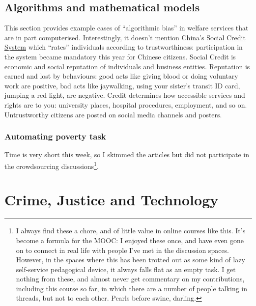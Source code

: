 \documentclass[
]{book}
\begin{document}
\hypertarget{china-scs}{%
\subsection{Algorithms and mathematical models}\label{china-scs}}

This section provides example cases of ``algorithmic bias'' in welfare services that are in part computerised. Interestingly, it doesn't mention China's \href{https://www.wired.co.uk/article/chinese-government-social-credit-score-privacy-invasion}{Social Credit System} which ``rates'' individuals according to trustworthiness: participation in the system became mandatory this year for Chinese citizens. Social Credit is economic and social reputation of individuals and business entities. Reputation is earned and lost by behaviours: good acts like giving blood or doing voluntary work are positive, bad acts like jaywalking, using your sister's transit ID card, jumping a red light, are negative. Credit determines how accessible services and rights are to you: university places, hospital procedures, employment, and so on. Untrustworthy citizens are posted on social media channels and posters.

\hypertarget{automating-poverty-task}{%
\subsubsection{Automating poverty task}\label{automating-poverty-task}}

Time is very short this week, so I skimmed the articles but did not participate in the crowdsourcing discussions\footnote{I always find these a chore, and of little value in online courses like this. It's become a formula for the MOOC: I enjoyed these once, and have even gone on to connect in real life with people I've met in the discussion spaces. However, in the spaces where this has been trotted out as some kind of lazy self-service pedagogical device, it always falls flat as an empty task. I get nothing from these, and almost never get commentary on my contributions, including this course so far, in which there are a number of people talking in threads, but not to each other. Pearls before swine, darling.}.

\hypertarget{crime-justice-and-technology}{%
\section{Crime, Justice and Technology}\label{crime-justice-and-technology}}
\end{document}

